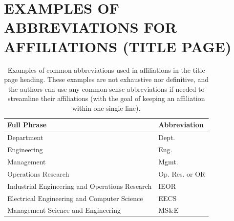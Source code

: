 \documentclass{wscpaperproc}
\theoremstyle{wsc}
\begin{document}
\newpage

\section*{EXAMPLES OF ABBREVIATIONS FOR AFFILIATIONS (TITLE PAGE)}
\begin{table}[htb]
\centering
\caption{Examples of common abbreviations used in affiliations in the title page heading. These examples are not exhaustive nor definitive, and the authors can use any common-sense abbreviations if needed to streamline their affiliations (with the goal of keeping an affiliation within one single line).}\label{table:abbreviation}
\begin{tabular}{|l|l|}
\hline
\textbf{Full Phrase} & \textbf{Abbreviation}\\ \hline
Department & Dept. \\ \hline
Engineering & Eng. \\ \hline
Management & Mgmt. \\ \hline
Operations Research & Op. Res. or OR \\ \hline
Industrial Engineering and Operations Research & IEOR \\ \hline
Electrical Engineering and Computer Science & EECS \\ \hline
Management Science and Engineering & MS$\&$E \\ \hline
\end{tabular}
\end{table}
\end{document}
